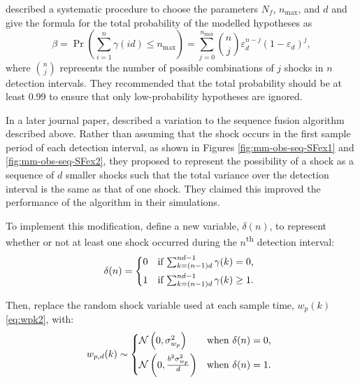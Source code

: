 {{\cite{robertson_detection_1995} described a systematic procedure to choose the parameters $N_f$, $n_\text{max}$, and $d$ and give the formula for the total probability of the modelled hypotheses as
\begin{equation} \label{eq:p_gamma}
	\beta=\operatorname{Pr}\left(\sum_{i=1}^{n} \gamma(i d) \leq n_\text{max} \right) = \sum_{j=0}^{n_\text{max}} \binom{n}{j} \varepsilon_d^{n-j}(1-\varepsilon_d)^{j},
\end{equation}
%
where $\binom{n}{j}$ represents the number of possible combinations of $j$ shocks in $n$ detection intervals. They recommended that the total probability should be at least 0.99 to ensure that only low-probability hypotheses are ignored.

In a later journal paper, \cite{robertson_method_1998} described a variation to the sequence fusion algorithm described above.  Rather than assuming that the shock occurs in the first sample period of each detection interval, as shown in Figures \ref{fig:mm-obs-seq-SFex1} and \ref{fig:mm-obs-seq-SFex2}, they proposed to represent the possibility of a shock as a sequence of $d$ smaller shocks such that the total variance over the detection interval is the same as that of one shock. They claimed this improved the performance of the algorithm in their simulations.

To implement this modification, define a new variable, $\delta(n)$, to represent whether or not at least one shock occurred during the $n$\textsuperscript{th} detection interval:
\begin{equation} \label{eq:deltak}
	\delta(n) = \begin{cases*}
		0 & \text{if} $\sum_{k=(n-1) d}^{n d - 1}{\gamma(k)} = 0$, \\
		1 & \text{if} $\sum_{k=(n-1) d}^{n d - 1}{\gamma(k)} \ge 1$.
	\end{cases*}
\end{equation}

Then, replace the random shock variable used at each sample time, $w_p(k)$ \eqref{eq:wpk2}, with:
\begin{equation} \label{eq:wpdk}
	w_{p,d}(k) \sim 
	\begin{cases*}
		\mathcal{N}\left(0, \sigma_{w_p}^2\right) & \text{when} $\delta(n) = 0$, \\
		\mathcal{N}\left(0, \frac{b^2\sigma_{w_p}^2}{d}\right) & \text{when} $\delta(n) = 1$.
	\end{cases*}
\end{equation}

}}
